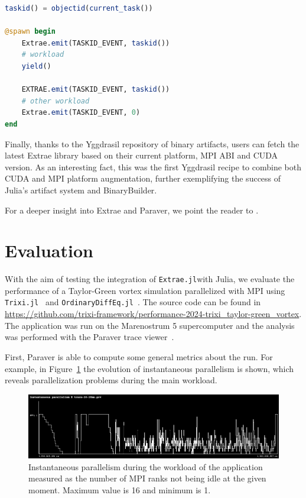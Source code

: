 \documentclass{juliacon}
\newcommand{\jlpkg}[1]{\texttt{#1}}
\newcommand{\extraejl}{\jlpkg{Extrae.jl}}
\begin{document}
\begin{lstlisting}[language=Julia, label=code:instrument-tasks, caption={Template code for instrumenting Julia tasks.}]
taskid() = objectid(current_task())

@spawn begin
    Extrae.emit(TASKID_EVENT, taskid())
    # workload
    yield()

    EXTRAE.emit(TASKID_EVENT, taskid())
    # other workload
    Extrae.emit(TASKID_EVENT, 0)
end
\end{lstlisting}

Finally, thanks to the Yggdrasil repository of binary artifacts, users can fetch the latest Extrae library based on their current platform, MPI ABI and CUDA version.
As an interesting fact, this was the first Yggdrasil recipe to combine both CUDA and MPI platform augmentation, further exemplifying the success of Julia's artifact system and BinaryBuilder.

For a deeper insight into Extrae and Paraver, we point the reader to \cite{extrae_documentation,paraver_reference,paraver_seminar}.

\section{Evaluation}\label{sec:evaluation}

With the aim of testing the integration of \extraejl with Julia, we evaluate the performance of a Taylor-Green vortex simulation parallelized with MPI using \jlpkg{Trixi.jl}~\cite{ranocha2022adaptive,schlottkelakemper2020trixi} and \jlpkg{OrdinaryDiffEq.jl}~\cite{DifferentialEquations.jl-2017}.
The source code can be found in \url{https://github.com/trixi-framework/performance-2024-trixi_taylor-green_vortex}.
The application was run on the Marenostrum 5 supercomputer and the analysis was performed with the Paraver trace viewer~\cite{paraver_reference,pillet1995paraver}.

First, Paraver is able to compute some general metrics about the run. For example, in Figure~\ref{fig:parallelism} the evolution of instantaneous parallelism is shown, which reveals parallelization problems during the main workload.

\begin{figure}[h]
    \centering
    \includegraphics[width=\linewidth]{Instantaneous_parallelism@trace-16-10ms.png}
    \caption{Instantaneous parallelism during the workload of the application measured as the number of MPI ranks not being idle at the given moment. Maximum value is 16 and minimum is 1.}
    \label{fig:parallelism}
\end{figure}
\end{document}

